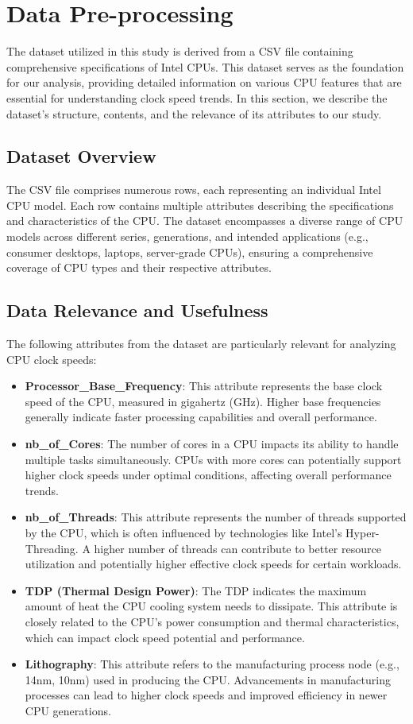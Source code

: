 \section{Data Pre-processing}
The dataset utilized in this study is derived from a CSV file containing comprehensive specifications of Intel CPUs. This dataset serves as the foundation for our analysis, providing detailed information on various CPU features that are essential for understanding clock speed trends. In this section, we describe the dataset's structure, contents, and the relevance of its attributes to our study.

\subsection{Dataset Overview}
The CSV file comprises numerous rows, each representing an individual Intel CPU model. Each row contains multiple attributes describing the specifications and characteristics of the CPU. The dataset encompasses a diverse range of CPU models across different series, generations, and intended applications (e.g., consumer desktops, laptops, server-grade CPUs), ensuring a comprehensive coverage of CPU types and their respective attributes.

\subsection{Data Relevance and Usefulness}
The following attributes from the dataset are particularly relevant for analyzing CPU clock speeds:

\begin{itemize}
    \item \textbf{Processor\_Base\_Frequency}: This attribute represents the base clock speed of the CPU, measured in gigahertz (GHz). Higher base frequencies generally indicate faster processing capabilities and overall performance.
    \item \textbf{nb\_of\_Cores}: The number of cores in a CPU impacts its ability to handle multiple tasks simultaneously. CPUs with more cores can potentially support higher clock speeds under optimal conditions, affecting overall performance trends.
    \item \textbf{nb\_of\_Threads}: This attribute represents the number of threads supported by the CPU, which is often influenced by technologies like Intel's Hyper-Threading. A higher number of threads can contribute to better resource utilization and potentially higher effective clock speeds for certain workloads.
    \item \textbf{TDP (Thermal Design Power)}: The TDP indicates the maximum amount of heat the CPU cooling system needs to dissipate. This attribute is closely related to the CPU's power consumption and thermal characteristics, which can impact clock speed potential and performance.
    \item \textbf{Lithography}: This attribute refers to the manufacturing process node (e.g., 14nm, 10nm) used in producing the CPU. Advancements in manufacturing processes can lead to higher clock speeds and improved efficiency in newer CPU generations.
\end{itemize}


